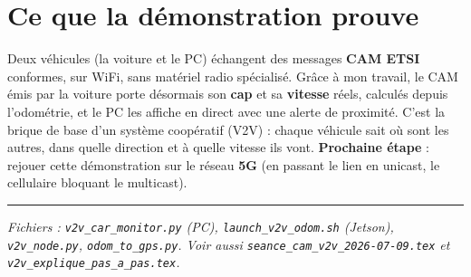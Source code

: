 \documentclass[a4paper,11pt]{article}
\newcommand{\code}[1]{\texttt{#1}}
\begin{document}
\section{Ce que la démonstration prouve}
Deux véhicules (la voiture et le PC) échangent des messages \textbf{CAM ETSI} conformes,
sur WiFi, sans matériel radio spécialisé. Grâce à mon travail, le CAM émis par la voiture
porte désormais son \textbf{cap} et sa \textbf{vitesse} réels, calculés depuis l'odométrie,
et le PC les affiche en direct avec une alerte de proximité. C'est la brique de base d'un
système coopératif (V2V) : chaque véhicule sait où sont les autres, dans quelle direction et
à quelle vitesse ils vont. \textbf{Prochaine étape} : rejouer cette démonstration sur le
réseau \textbf{5G} (en passant le lien en unicast, le cellulaire bloquant le multicast).

\vspace{8pt}\hrule
{\footnotesize\itshape Fichiers : \code{v2v\_car\_monitor.py} (PC), \code{launch\_v2v\_odom.sh}
(Jetson), \code{v2v\_node.py}, \code{odom\_to\_gps.py}. Voir aussi
\code{seance\_cam\_v2v\_2026-07-09.tex} et \code{v2v\_explique\_pas\_a\_pas.tex}.}
\end{document}
